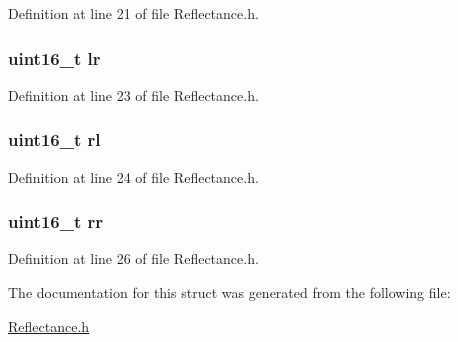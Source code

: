 Definition at line 21 of file Reflectance.\+h.

\subsubsection[{\texorpdfstring{lr}{lr}}]{\setlength{\rightskip}{0pt plus 5cm}uint16\+\_\+t lr}\hypertarget{structdigital__sensor__value___af650f74b54fbe6d55c96161d2a7098ea}{}\label{structdigital__sensor__value___af650f74b54fbe6d55c96161d2a7098ea}


Definition at line 23 of file Reflectance.\+h.

\subsubsection[{\texorpdfstring{rl}{rl}}]{\setlength{\rightskip}{0pt plus 5cm}uint16\+\_\+t rl}\hypertarget{structdigital__sensor__value___a55f8b53aee5b41e8af88a816fab2b70b}{}\label{structdigital__sensor__value___a55f8b53aee5b41e8af88a816fab2b70b}


Definition at line 24 of file Reflectance.\+h.

\subsubsection[{\texorpdfstring{rr}{rr}}]{\setlength{\rightskip}{0pt plus 5cm}uint16\+\_\+t rr}\hypertarget{structdigital__sensor__value___a6988d1a89f109b3f8d0e06547a5362f6}{}\label{structdigital__sensor__value___a6988d1a89f109b3f8d0e06547a5362f6}


Definition at line 26 of file Reflectance.\+h.



The documentation for this struct was generated from the following file\+:\begin{DoxyCompactItemize}
\item 
\hyperlink{_reflectance_8h}{Reflectance.\+h}\end{DoxyCompactItemize}
